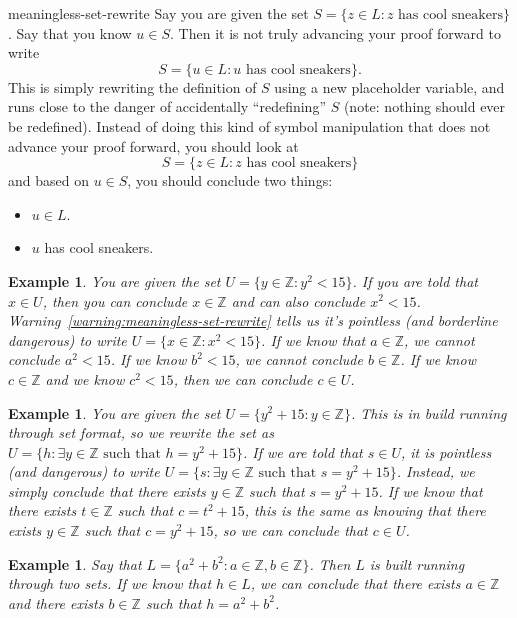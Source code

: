 \documentclass{book}
\newcounter{ekcounter}%
\theoremstyle{ekimcustom}
\newtheorem{example}[ekcounter]{Example}
\begin{document}
\begin{bwarning}{}{meaningless-set-rewrite}
Say you are given the set $S = \{z \in L : z \text{ has cool sneakers}\}$. Say that you know $u \in S$. Then it is not truly advancing your proof forward to write
\[S = \{u \in L : u \text{ has cool sneakers}\}.\]
This is simply rewriting the definition of $S$ using a new placeholder variable, and runs close to the danger of accidentally ``redefining'' $S$ (note: nothing should ever be redefined). Instead of doing this kind of symbol manipulation that does not advance your proof forward, you should look at
\[S = \{z \in L : z \text{ has cool sneakers}\}\]
and based on $u \in S$, you should conclude two things:
\begin{itemize}
\item $u \in L$.
\item $u$ has cool sneakers.
\end{itemize}
\end{bwarning}

\begin{example}
You are given the set $U = \{y \in \mathbb{Z} : y^2 < 15\}$. If you are told that $x \in U$, then you can conclude $x \in \mathbb{Z}$ and can also conclude $x^2 < 15$. Warning~\ref{warning:meaningless-set-rewrite} tells us it's pointless (and borderline dangerous) to write $U = \{x \in \mathbb{Z} : x^2 < 15\}$. If we know that $a \in \mathbb{Z}$, we cannot conclude $a^2 < 15$. If we know $b^2 < 15$, we cannot conclude $b \in \mathbb{Z}$. If we know $c \in \mathbb{Z}$ and we know $c^2 <15$, then we can conclude $c \in U$.
\end{example}
\begin{example}
You are given the set $U = \{y^2 + 15 : y \in \mathbb{Z}\}$. This is in build running through set format, so we rewrite the set as $U = \{h : \exists y \in \mathbb{Z} \text{ such that } h = y^2+15\}$. If we are told that $s \in U$, it is pointless (and dangerous) to write $U = \{s : \exists y \in \mathbb{Z} \text{ such that } s = y^2+15\}$. Instead, we simply conclude that there exists $y \in \mathbb{Z}$ such that $s = y^2+15$. If we know that there exists $t \in \mathbb{Z}$ such that $c = t^2+15$, this is the same as knowing that there exists $y \in \mathbb{Z}$ such that $c = y^2+15$, so we can conclude that $c \in U$.
\end{example}
\begin{example}
Say that $L = \{a^2+b^2 : a \in \mathbb{Z}, b \in \mathbb{Z}\}$. Then $L$ is built running through two sets. If we know that $h \in L$, we can conclude that there exists $a \in \mathbb{Z}$ and there exists $b \in \mathbb{Z}$ such that $h = a^2+b^2$.
\end{example}
\end{document}
